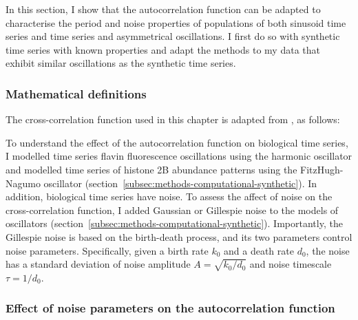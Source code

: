 In this section, I show that the autocorrelation function can be adapted to characterise the period and noise properties of populations of both sinusoid time series and time series and asymmetrical oscillations.
I first do so with synthetic time series with known properties and adapt the methods to my data that exhibit similar oscillations as the synthetic time series.

\subsubsection{Mathematical definitions}
\label{subsubsec:analysis-characterisation-acf-maths}

The cross-correlation function used in this chapter is adapted from \textcite{pietschDeterminingGrowthRates2023}, as follows:


To understand the effect of the autocorrelation function on biological time series, I modelled time series flavin fluorescence oscillations using the harmonic oscillator and modelled time series of histone 2B abundance patterns using the FitzHugh-Nagumo oscillator \parencite{fitzhughImpulsesPhysiologicalStates1961} (section~\ref{subsec:methods-computational-synthetic}).
In addition, biological time series have noise.
To assess the affect of noise on the cross-correlation function, I added Gaussian or Gillespie noise to the models of oscillators (section~\ref{subsec:methods-computational-synthetic}).
Importantly, the Gillespie noise is based on the birth-death process, and its two parameters control noise parameters.
Specifically, given a birth rate $k_{0}$ and a death rate $d_{0}$, the noise has a standard deviation of noise amplitude $A = \sqrt{k_{0}/d_{0}}$ and noise timescale $\tau = 1/d_{0}$.


\subsubsection{Effect of noise parameters on the autocorrelation function}
\label{subsubsec:analysis-characterisation-acf-sinusoid}

